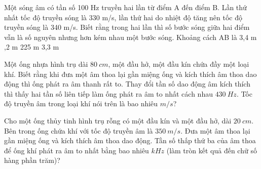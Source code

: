 \begin{ex}%
Một sóng âm có tần số 100 Hz truyền hai lần từ điểm A đến điểm B. Lần thứ nhất tốc độ truyền sóng là 330 m/s, lần thứ hai do nhiệt độ tăng nên tốc độ truyền sóng là 340 m/s. Biết rằng trong hai lần thì số bước sóng giữa hai điểm vẫn là số nguyên nhưng hơn kém nhau một bước sóng. Khoảng cách AB là
\choice
{3,4 m}
{,2 m}
{225 m}
{3,3 m}
\end{ex} 
\begin{ex}%
Một ống nhựa hình trụ dài $80 ~cm$, một đầu hở, một đầu kín chứa đầy một loại khí. Biết rằng khi đưa một âm thoa lại gần miệng ống và kích thích âm thoa dao động thì ống phát ra âm thanh rất to. Thay đổi tần số dao động âm kích thích thì thấy hai tần số liên tiếp làm ống phát ra âm to nhất cách nhau $430 ~Hz$. Tốc độ truyền âm trong loại khí nói trên là bao nhiêu $m/s$?\\
\end{ex} 
\begin{ex}%
Cho một ống thủy tinh hình trụ rỗng có một đầu kín và một đầu hở, dài $20 ~cm$. Bên trong ống chứa khí với tốc độ truyền âm là $350 ~m/s$. Đưa một âm thoa lại gần miệng ống và kích thích âm thoa dao động. Tần số thấp thứ ba của âm thoa để ống khí phát ra âm to nhất bằng bao nhiêu $kHz$ (làm tròn kết quả đến chữ số hàng phần trăm)?
\end{ex} 
